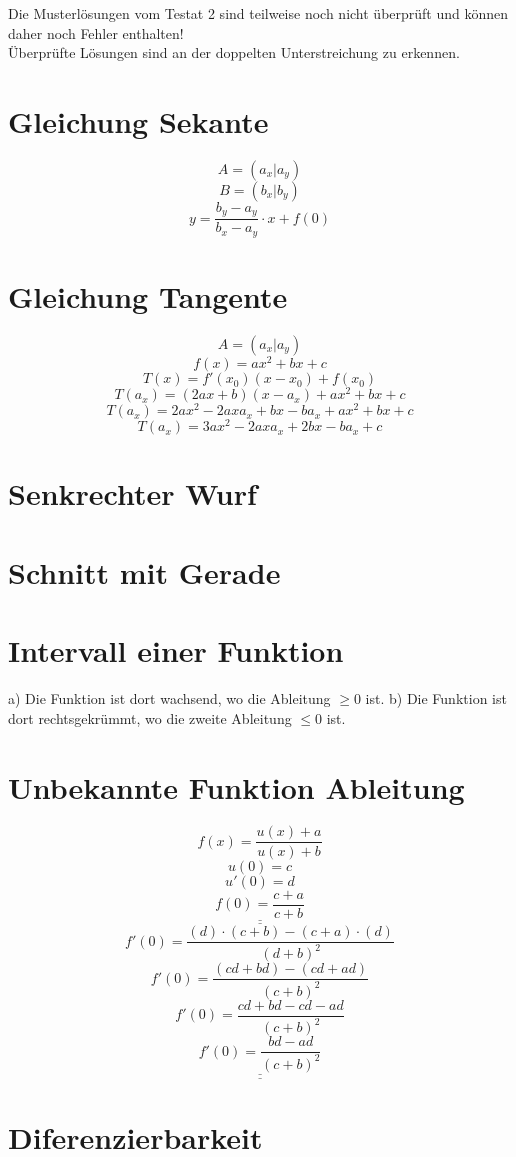 Die Musterlösungen vom Testat 2 sind teilweise noch nicht überprüft und können daher noch Fehler enthalten! \\
Überprüfte Lösungen sind an der doppelten Unterstreichung zu erkennen. 
\section{Gleichung Sekante}
\[ A = (a_x | a_y) \]
\[ B = (b_x | b_y) \]
\[ y = \frac{b_y - a_y}{b_x - a_y} \cdot x + f(0) \]

\section{Gleichung Tangente}
\[ A = (a_x | a_y) \]
\[ f(x) = a x^2 + b x + c \]
\[ T(x) = f'(x_0)(x - x_0) + f(x_0) \]
\[ T(a_x) = (2 a x + b)(x - a_x) + a x^2 + b x + c \]
\[ T(a_x) = 2 a x^2 - 2 a x a_x + b x - b a_x + a x^2 + b x + c \]
\[ T(a_x) = 3 a x^2 - 2 a x a_x + 2 b x - b a_x + c \]

\section{Senkrechter Wurf}


\section{Schnitt mit Gerade}


\section{Intervall einer Funktion}
a) 
Die Funktion ist dort wachsend, wo die Ableitung $\geq 0$ ist. 
b) 
Die Funktion ist dort rechtsgekrümmt, wo die zweite Ableitung $\leq 0$ ist. 

\section{Unbekannte Funktion Ableitung}
\[ f(x) = \frac{u(x) + a}{u(x) + b} \]
\[ u(0) = c \]
\[ u'(0) = d \]
\[ \underline{\underline{f(0) = \frac{c + a}{c + b}}} \]
\[ f'(0) = \frac{(d) \cdot (c + b) - (c + a) \cdot (d)}{(d + b)^2} \]
\[ f'(0) = \frac{(c d + b d) - (c d + a d)}{(c + b)^2} \]
\[ f'(0) = \frac{c d + b d - c d - a d}{(c + b)^2} \]
\[ \underline{\underline{f'(0) = \frac{b d - a d}{(c + b)^2}}} \]

\section{Diferenzierbarkeit}


